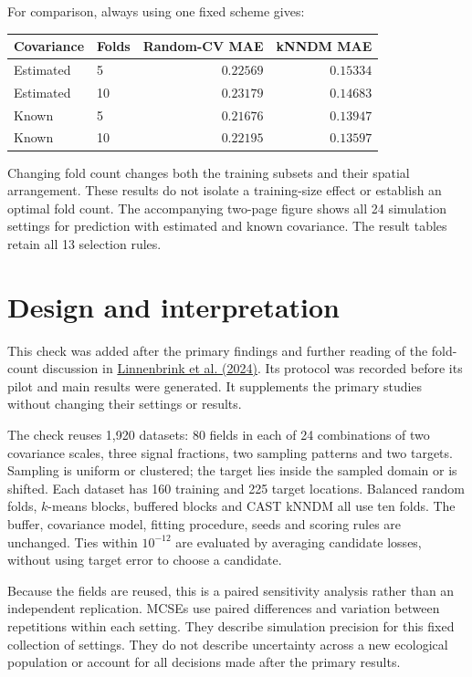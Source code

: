\documentclass[11pt,a4paper]{article}
\begin{document}
For comparison, always using one fixed scheme gives:
\begin{center}\small
\begin{tabular}{llrr}\toprule
Covariance & Folds & Random-CV MAE & kNNDM MAE\\\midrule
Estimated & 5 & $0.22569$ & $0.15334$ \\
Estimated & 10 & $0.23179$ & $0.14683$ \\
Known & 5 & $0.21676$ & $0.13947$ \\
Known & 10 & $0.22195$ & $0.13597$ \\
\bottomrule\end{tabular}
\end{center}
Changing fold count changes both the training subsets and their spatial arrangement. These results do not isolate a training-size effect or establish an optimal fold count. The accompanying two-page figure shows all 24 simulation settings for prediction with estimated and known covariance. The result tables retain all 13 selection rules.

\newpage
\section*{Design and interpretation}
This check was added after the primary findings and further reading of the fold-count discussion in \href{https://doi.org/10.5194/gmd-17-5897-2024}{Linnenbrink et al. (2024)}. Its protocol was recorded before its pilot and main results were generated. It supplements the primary studies without changing their settings or results.

The check reuses 1,920 datasets: 80 fields in each of 24 combinations of two covariance scales, three signal fractions, two sampling patterns and two targets. Sampling is uniform or clustered; the target lies inside the sampled domain or is shifted. Each dataset has 160 training and 225 target locations. Balanced random folds, $k$-means blocks, buffered blocks and CAST kNNDM all use ten folds. The buffer, covariance model, fitting procedure, seeds and scoring rules are unchanged. Ties within $10^{-12}$ are evaluated by averaging candidate losses, without using target error to choose a candidate.

Because the fields are reused, this is a paired sensitivity analysis rather than an independent replication. MCSEs use paired differences and variation between repetitions within each setting. They describe simulation precision for this fixed collection of settings. They do not describe uncertainty across a new ecological population or account for all decisions made after the primary results.
\end{document}
